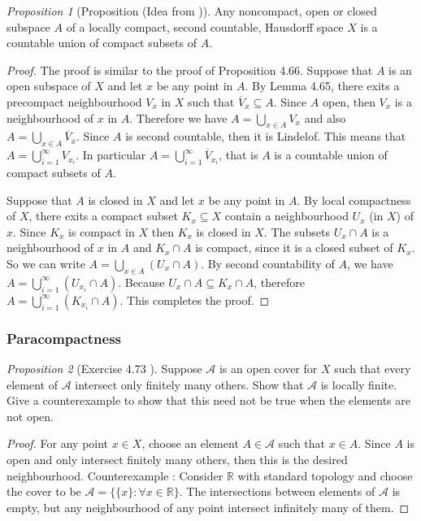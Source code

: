 \documentclass[a4paper]{article}
\theoremstyle{remark}
\newtheorem{prop}{Proposition}
\newcommand{\subhim}{\subseteq} %
\begin{document}
\begin{prop}[Proposition (Idea from \cite{Munkres})]
 Any noncompact, open or closed subspace $A$ of a locally compact, second countable, Hausdorff space $X$ is a countable union of compact subsets of $A$.
\end{prop}
\begin{proof}
	The proof is similar to the proof of Proposition 4.66. Suppose that $A$ is an open subspace of $X$ and let $x$ be any point in $A$. By Lemma 4.65, there exits a precompact neighbourhood $V_x$ in $X$ such that $\overline{V}_x \subhim A$. Since $A$ open, then $V_x$ is a neighbourhood of $x$ in $A$. Therefore we have $A = \bigcup_{x \in A} V_x$ and also $A= \bigcup_{x \in A} \overline{V}_x$. Since $A$ is second countable, then it is Lindelof. This means that $A = \bigcup_{i=1}^{\infty} V_{x_i}$. In particular $A =\bigcup_{i=1}^{\infty} \overline{V}_{x_i} $, that is $A$ is a countable union of compact subsets of $A$.
	
	Suppose that $A$ is closed in $X$ and let $x$ be any point in $A$. By local compactness of $X$, there exits a compact subset $K_x\subhim X$ contain a neighbourhood $U_x$ (in $X$) of $x$. Since $K_x$ is compact in $X$ then $K_x$ is closed in $X$. The subsets $U_x \cap A$ is a neighbourhood of $x$ in $A$ and $K_x\cap A$ is compact, since it is a closed subset of $K_x$. So we can write $A= \bigcup_{x \in A} (U_x \cap A)$. By second countability of $A$, we have $A = \bigcup_{i =1}^{\infty} (U_{x_i}\cap A)$. Because $U_x \cap A \subhim K_x \cap A$, therefore $A = \bigcup_{i =1}^{\infty} (K_{x_i} \cap A)$. This completes the proof.   
\end{proof}

\subsubsection*{Paracompactness}
\begin{prop}[Exercise 4.73 \cite{LeeTM}]
	Suppose $\mathcal{A}$ is an open cover for $X$ such that every element of $\mathcal{A}$ intersect only finitely many others. Show that $\mathcal{A}$ is locally finite. Give a counterexample to show that this need not be true when the elements are not open.
\end{prop}
\begin{proof}
	For any point $x \in X$, choose an element $A \in \mathcal{A}$ such that $x \in A$. Since $A$ is open and only intersect finitely many others, then this is the desired neighbourhood. Counterexample : Consider $\mathbb{R}$ with standard topology and choose the cover to be $\mathcal{A} = \{ \{x\} : \forall x \in \mathbb{R} \}$. The intersections between elements of $\mathcal{A}$ is empty, but any neighbourhood of any point intersect infinitely many of them. 
\end{proof}
\end{document}
